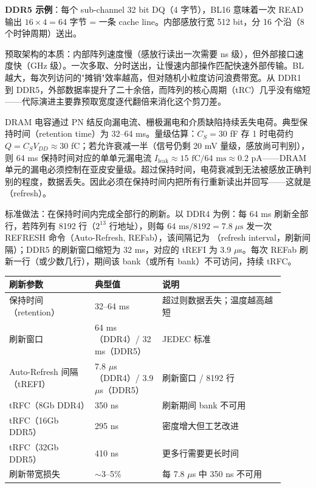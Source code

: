 \textbf{DDR5 示例}：每个 sub-channel 32 bit DQ（4 字节），BL16 意味着一次 READ 输出 $16 \times 4 = 64$ 字节 = 一条 cache line。内部感放行宽 512 bit，分 16 个沿（8 个时钟周期）送出。

\begin{keyidea}
预取架构的本质：内部阵列速度慢（感放行读出一次需要 ns 级），但外部接口速度快（GHz 级）。一次多取、分时送出，让慢速内部操作匹配快速外部传输。BL 越大，每次列访问的"摊销"效率越高，但对随机小粒度访问浪费带宽。从 DDR1 到 DDR5，外部数据率提升了二十余倍，而阵列的核心周期（tRC）几乎没有缩短——代际演进主要靠预取宽度逐代翻倍来消化这个剪刀差。
\end{keyidea}


DRAM 电容通过 PN 结反向漏电流、栅极漏电和介质缺陷持续丢失电荷。典型保持时间（retention time）为 32--64 ms。量级估算：$C_S = 30$ fF 存 1 时电荷约 $Q = C_S V_{DD} \approx 30$ fC；若允许衰减一半（信号仍剩 20 mV 量级，感放尚可判别），则 64 ms 保持时间对应的单单元漏电流 $I_{\text{leak}} \approx 15\text{ fC} / 64\text{ ms} \approx 0.2$ pA——DRAM 单元的漏电必须控制在亚皮安量级。超过保持时间，电荷衰减到无法被感放正确判别的程度，数据丢失。因此必须在保持时间内把所有行重新读出并回写——这就是（refresh）。


标准做法：在保持时间内完成全部行的刷新。以 DDR4 为例：每 64 ms 刷新全部行，若阵列有 8192 行（$2^{13}$ 行地址），则每 $64\text{ ms} / 8192 = 7.8\;\mu\text{s}$ 发一次 REFRESH 命令（Auto-Refresh, REFab），该间隔记为 （refresh interval，刷新间隔）；DDR5 的刷新窗口缩短为 32 ms，对应的 tREFI 为 3.9 $\mu$s。每次 REFab 刷新一行（或少数几行），期间该 bank（或所有 bank）不可访问，持续 tRFC。

\begin{longtable}{L{0.28\linewidth}L{0.22\linewidth}L{0.4\linewidth}}
\toprule
刷新参数 & 典型值 & 说明 \\
\midrule
保持时间（retention） & 32--64 ms & 超过则数据丢失；温度越高越短 \\
刷新窗口 & 64 ms（DDR4）/ 32 ms（DDR5） & JEDEC 标准 \\
Auto-Refresh 间隔（tREFI） & 7.8 $\mu$s（DDR4）/ 3.9 $\mu$s（DDR5） & 刷新窗口 / 8192 行 \\
tRFC（8Gb DDR4） & 350 ns & 刷新期间 bank 不可用 \\
tRFC（16Gb DDR5） & 295 ns & 密度增大但工艺改进 \\
tRFC（32Gb DDR5） & 410 ns & 更多行需要更长时间 \\
刷新带宽损失 & $\sim$3--5\% & 每 7.8 $\mu$s 中 350 ns 不可用 \\
\bottomrule
\end{longtable}


